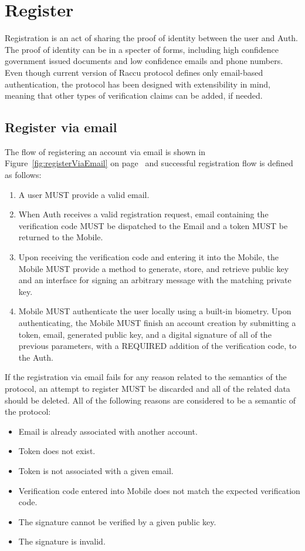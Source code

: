 \section{Register}
Registration is an act of sharing the proof of identity between the user and Auth. The proof of identity
can be in a specter of forms, including high confidence government issued documents and low confidence emails and 
phone numbers. Even though current version of Raccu protocol defines only email-based authentication, the protocol
has been designed with extensibility in mind, meaning that other types of verification claims can be added, if
needed.

      \subsection{Register via email}
      The flow of registering an account via email is shown in Figure~\ref{fig:registerViaEmail} on 
      page~\pageref{fig:registerViaEmail} and successful registration flow is defined as follows:
      \begin{enumerate}
            \item A user MUST provide a valid email.
            \item When Auth receives a valid registration request, email containing the verification code MUST 
                  be dispatched to the Email and a token MUST be returned to the Mobile.
            \item Upon receiving the verification code and entering it into the Mobile, the Mobile MUST provide 
                  a method to generate, store, and retrieve public key and an interface for signing an arbitrary 
                  message with the matching private key.
            \item Mobile MUST authenticate the user locally using a built-in biometry. Upon authenticating, 
                  the Mobile MUST finish an account creation by submitting a token, email, generated public key, 
                  and a digital signature of all of the previous parameters, with a REQUIRED addition of the 
                  verification code, to the Auth.
      \end{enumerate}
             
      If the registration via email fails for any reason related to the semantics of the protocol, an attempt to
      register MUST be discarded and all of the related data should be deleted. All of the following reasons are 
      considered to be a semantic of the protocol:
      \begin{itemize}
            \item Email is already associated with another account.
            \item Token does not exist.
            \item Token is not associated with a given email.
            \item Verification code entered into Mobile does not match the expected verification code.
            \item The signature cannot be verified by a given public key.
            \item The signature is invalid.
      \end{itemize}
